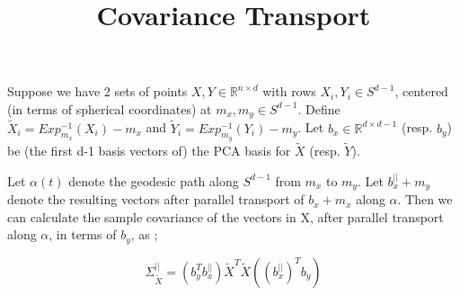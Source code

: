 \documentclass[]{article}
\title{Covariance Transport}
\begin{document}

%

Suppose we have 2 sets of points $X,Y \in \mathbb{R}^{n \times d}$ with rows $X_i, Y_i \in S^{d-1}$, centered (in terms of spherical coordinates) at $m_x, m_y \in S^{d-1}$. Define $\tilde{X}_i = Exp_{m_x}^{-1}(X_i)-m_x$ and $\tilde{Y}_i = Exp_{m_y}^{-1}(Y_i)-m_y$. Let $b_x \in \mathbb{R}^{d \times d-1}$ (resp. $b_y$) be (the first d-1 basis vectors of) the PCA basis for $\tilde{X}$ (resp. $\tilde{Y}$). 

Let $\alpha(t)$ denote the geodesic path along $S^{d-1}$ from $m_x$ to $m_y$. Let $b_{x}^{||} + m_y$ denote the resulting vectors after parallel transport of $b_{x} + m_x$ along $\alpha$. Then we can calculate the sample covariance of the vectors in X, after parallel transport along $\alpha$, in terms of $b_y$, as ;  




\begin{equation}
	\Sigma_{\tilde{X}}^{||} = ( b_y^T b_x^{||}) \tilde{X}^T \tilde{X} ((b_x^{||})^T b_y)
\end{equation}
\end{document}
